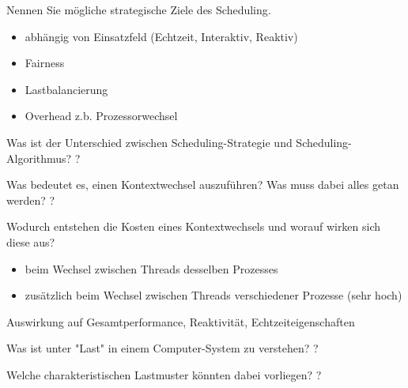 \documentclass[avery5371]{flashcards}
\begin{document}
\begin{flashcard}{Nennen Sie mögliche strategische Ziele des Scheduling.}
    \begin{itemize}
        \item abhängig von Einsatzfeld (Echtzeit, Interaktiv, Reaktiv)
        \item Fairness
        \item Lastbalancierung
        \item Overhead z.b. Prozessorwechsel
    \end{itemize}
\end{flashcard}

\begin{flashcard}{Was ist der Unterschied zwischen Scheduling-Strategie und Scheduling-Algorithmus?}
    ?
\end{flashcard}

\begin{flashcard}[Kontextwechsel]{Was bedeutet es, einen Kontextwechsel auszuführen? Was muss dabei alles getan werden?}
    ?
\end{flashcard}

\begin{flashcard}[Kontextwechsel]{Wodurch entstehen die Kosten eines Kontextwechsels und worauf wirken sich diese aus?}
    \begin{itemize}
        \item beim Wechsel zwischen Threads desselben Prozesses
        \item zusätzlich beim Wechsel zwischen Threads verschiedener Prozesse (sehr hoch)
    \end{itemize}
    Auswirkung auf Gesamtperformance, Reaktivität, Echtzeiteigenschaften
\end{flashcard}

\begin{flashcard}{Was ist unter "Last" in einem Computer-System zu verstehen?}
    ?
\end{flashcard}

\begin{flashcard}{Welche charakteristischen Lastmuster könnten dabei vorliegen?}
    ?
\end{flashcard}
\end{document}
